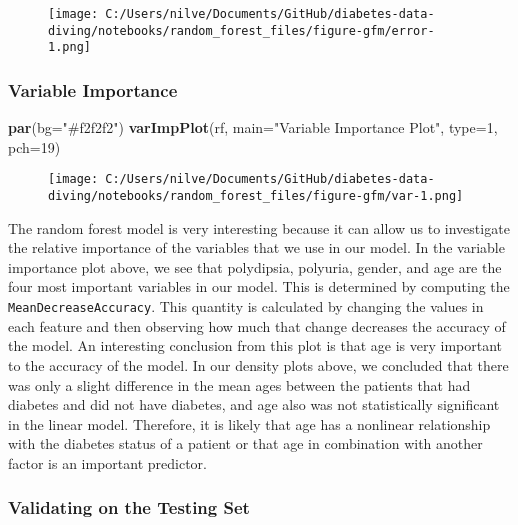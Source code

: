 \documentclass[
]{article}
\newenvironment{Shaded}{}{}
\newcommand{\DataTypeTok}[1]{\textcolor[rgb]{0.56,0.13,0.00}{#1}}
\newcommand{\DecValTok}[1]{\textcolor[rgb]{0.25,0.63,0.44}{#1}}
\newcommand{\KeywordTok}[1]{\textcolor[rgb]{0.00,0.44,0.13}{\textbf{#1}}}
\newcommand{\NormalTok}[1]{#1}
\newcommand{\StringTok}[1]{\textcolor[rgb]{0.25,0.44,0.63}{#1}}
\begin{document}
\begin{figure}
\centering
\texttt{[image: C:/Users/nilve/Documents/GitHub/diabetes-data-diving/notebooks/random\_forest\_files/figure-gfm/error-1.png]}
\caption{}
\end{figure}

\hypertarget{header-n967}{%
\subsubsection{Variable Importance}\label{header-n967}}

\begin{Shaded}
\begin{Highlighting}[]
\KeywordTok{par}\NormalTok{(}\DataTypeTok{bg=}\StringTok{"#f2f2f2"}\NormalTok{)}
\KeywordTok{varImpPlot}\NormalTok{(rf, }\DataTypeTok{main=}\StringTok{"Variable Importance Plot"}\NormalTok{, }\DataTypeTok{type=}\DecValTok{1}\NormalTok{, }\DataTypeTok{pch=}\DecValTok{19}\NormalTok{)}
\end{Highlighting}
\end{Shaded}

\begin{figure}
\centering
\texttt{[image: C:/Users/nilve/Documents/GitHub/diabetes-data-diving/notebooks/random\_forest\_files/figure-gfm/var-1.png]}
\caption{}
\end{figure}

The random forest model is very interesting because it can allow us to
investigate the relative importance of the variables that we use in our
model. In the variable importance plot above, we see that polydipsia,
polyuria, gender, and age are the four most important variables in our
model. This is determined by computing the
\texttt{MeanDecreaseAccuracy}. This quantity is calculated by changing
the values in each feature and then observing how much that change
decreases the accuracy of the model. An interesting conclusion from this
plot is that age is very important to the accuracy of the model. In our
density plots above, we concluded that there was only a slight
difference in the mean ages between the patients that had diabetes and
did not have diabetes, and age also was not statistically significant in
the linear model. Therefore, it is likely that age has a nonlinear
relationship with the diabetes status of a patient or that age in
combination with another factor is an important predictor.

\hypertarget{header-n971}{%
\subsubsection{Validating on the Testing Set}\label{header-n971}}
\end{document}
